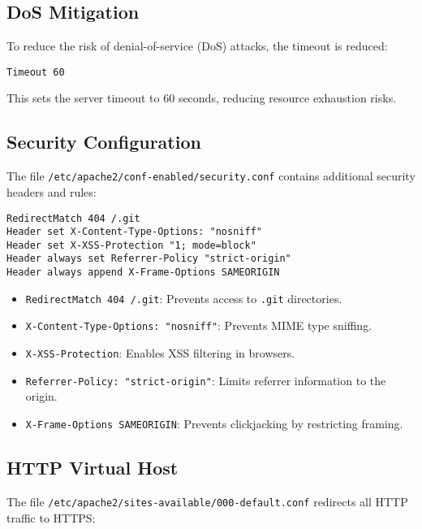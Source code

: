 \documentclass[12pt]{report}
\begin{document}
\subsection*{DoS Mitigation}
To reduce the risk of denial-of-service (DoS) attacks, the timeout is reduced:

\begin{lstlisting}[caption={Timeout Configuration}]
Timeout 60
\end{lstlisting}

This sets the server timeout to 60 seconds, reducing resource exhaustion risks.

\subsection*{Security Configuration}
The file \texttt{/etc/apache2/conf-enabled/security.conf} contains additional security headers and rules:

\begin{lstlisting}[caption={Security Configuration in security.conf}]
RedirectMatch 404 /.git
Header set X-Content-Type-Options: "nosniff"
Header set X-XSS-Protection "1; mode=block"
Header always set Referrer-Policy "strict-origin"
Header always append X-Frame-Options SAMEORIGIN
\end{lstlisting}

\begin{itemize}
\item \texttt{RedirectMatch 404 /.git}: Prevents access to \texttt{.git} directories.
\item \texttt{X-Content-Type-Options: "nosniff"}: Prevents MIME type sniffing.
\item \texttt{X-XSS-Protection}: Enables XSS filtering in browsers.
\item \texttt{Referrer-Policy: "strict-origin"}: Limits referrer information to the origin.
\item \texttt{X-Frame-Options SAMEORIGIN}: Prevents clickjacking by restricting framing.
\end{itemize}

\subsection*{HTTP Virtual Host}
The file \texttt{/etc/apache2/sites-available/000-default.conf} redirects all HTTP traffic to HTTPS:
\end{document}
